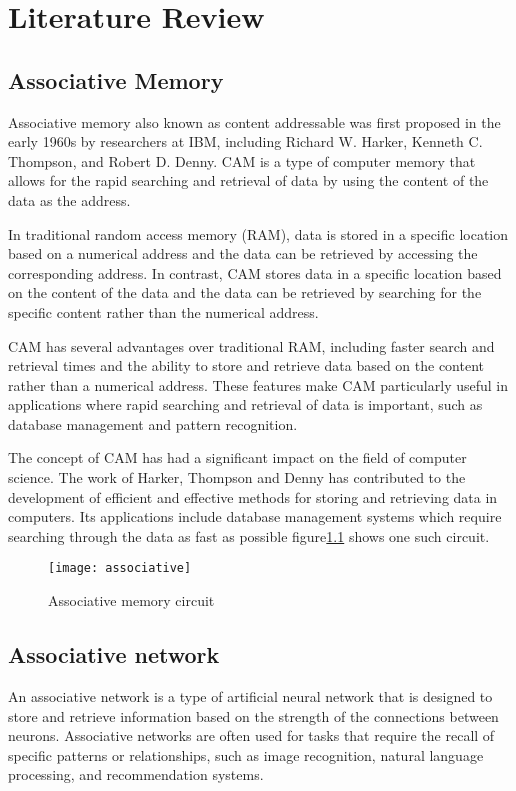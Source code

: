 \chapter{Literature Review}

\section{Associative Memory}
Associative memory also known as content addressable was first proposed in the
early 1960s by researchers at IBM, including Richard W. Harker, Kenneth C.
Thompson, and Robert D. Denny. CAM is a type of computer memory that allows for
the rapid searching and retrieval of data by using the content of the data as
the address.

In traditional random access memory (RAM), data is stored in a specific
location based on a numerical address and the data can be retrieved by
accessing the corresponding address. In contrast, CAM stores data in a specific
location based on the content of the data and the data can be retrieved by
searching for the specific content rather than the numerical address.

CAM has several advantages over traditional RAM, including faster search and
retrieval times and the ability to store and retrieve data based on the content
rather than a numerical address. These features make CAM particularly useful in
applications where rapid searching and retrieval of data is important, such as
database management and pattern recognition.

The concept of CAM has had a significant impact on the field of computer
science. The work of Harker, Thompson and Denny has contributed to the
development of efficient and effective methods for storing and retrieving data
in computers. Its applications include database management systems which
require searching through the data as fast as possible
figure\ref{associative_circuit} shows one such circuit.
\begin{figure}[h!]
    \centering
    \texttt{[image: associative]}
    \caption{Associative memory circuit}\label{associative_circuit}
\end{figure}

\section{Associative network}
An associative network is a type of artificial neural network that is designed
to store and retrieve information based on the strength of the connections
between neurons. Associative networks are often used for tasks that require the
recall of specific patterns or relationships, such as image recognition,
natural language processing, and recommendation systems.
